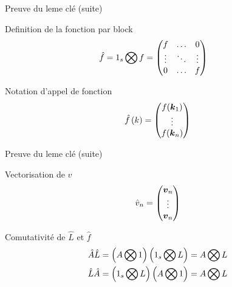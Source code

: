 \begin{frame}{Preuve du leme clé (suite)}
\begin{block}{Definition de la fonction par block}
 \begin{align*}
\hat{f}&=1_{s}\bigotimes f=\begin{pmatrix}f	&\ldots	&0\\
			\vdots &\ddots 	&\vdots\\
			0	&\ldots	&f\\
	\end{pmatrix}
\end{align*}
\end{block}
\begin{block}{Notation d'appel de fonction}
 \begin{equation*}
 \hat{f}\left(k\right)=\begin{pmatrix}f({\boldsymbol {k}}_1)\\
			\vdots\\
			f({\boldsymbol {k}}_n)\\
	\end{pmatrix}
\end{equation*}
\end{block}

\end{frame}

\begin{frame}{Preuve du leme clé (suite)}
 \begin{block}{Vectorisation de $v$}
  \begin{equation*}
\hat{v}_{n}=\begin{pmatrix}
	      {\boldsymbol {v}}_{n}\\
	      \vdots\\
	      {\boldsymbol {v}}_{n}
	      \end{pmatrix}
\end{equation*}
 \end{block}
 
 \begin{block}{Comutativité de $\hat{L}$ et $\hat{f}$}
  \begin{align*}
\hat{A}\hat{L}&=\left(A\bigotimes 1 \right)
  \left(1_{s}\bigotimes L\right)=
	A\bigotimes L\\
    \hat{L}\hat{A}&=
  \left(1_{s}\bigotimes L\right)
	\left(A \bigotimes 1 \right)=
	A\bigotimes L
\end{align*}
 \end{block}

\end{frame}

